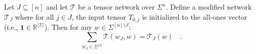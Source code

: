 \documentclass[../../main.tex]{subfiles}
\begin{document}
    \begin{proposition}
        \label{proposition:marginalized_tensor_network}
        Let $J \subseteq [n]$ and let $\mathcal{T}$ be a tensor network over $\Sigma^n$. Define a modified network $\mathcal{T}_J$ where for all $j \in J$, the input tensor $T_{0,j}$ is initialized to the all-ones vector (i.e., $\mathbf{1} \in \mathbb{R}^{|\Sigma|}$). Then for any $w \in \Sigma^{[n] \setminus J}$:
        \[
            \sum_{w_J \in \Sigma^{|J|}} \mathcal{T}(w_J, w) = \mathcal{T}_J(w) \quad .
        \]
    \end{proposition}




\end{document}
